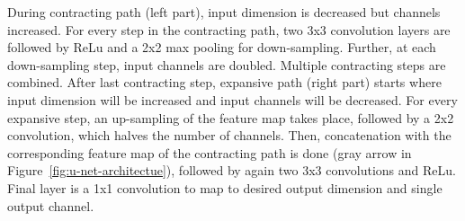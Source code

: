 During contracting path (left part), input dimension is decreased but channels increased.
For every step in the contracting path, two 3x3 convolution layers are followed by ReLu
and a 2x2 max pooling for down-sampling. Further, at each down-sampling step, input channels are doubled.
Multiple contracting steps are combined. After last contracting step, expansive path (right part) starts
where input dimension will be increased and input channels will be decreased.
For every expansive step, an up-sampling of the feature map takes place, followed by a 2x2 convolution, 
which halves the number of channels. Then, concatenation with the corresponding feature
map of the contracting path is done (gray arrow in Figure~\ref{fig:u-net-architectue}), followed by again two 3x3 convolutions and ReLu.
Final layer is a 1x1 convolution to map to desired output dimension and single output channel.


